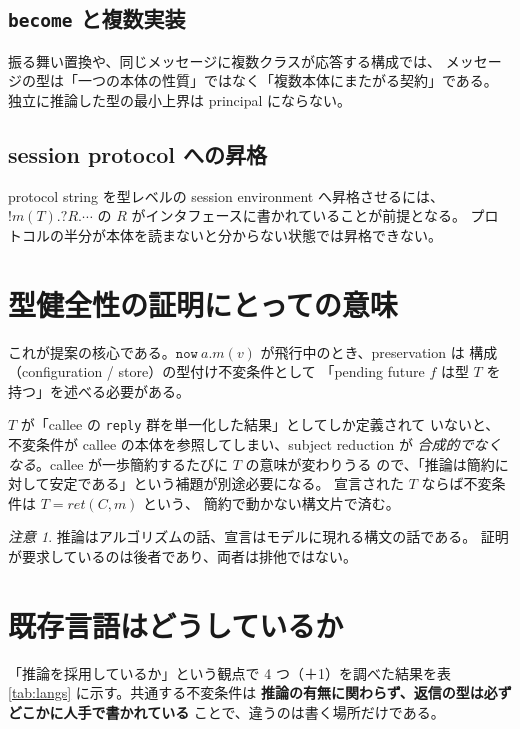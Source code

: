 \documentclass[11pt,a4paper]{ltjsarticle}
\theoremstyle{definition}
\theoremstyle{remark}
\newtheorem{remark}{注意}
\newcommand{\ty}[1]{\ensuremath{\mathtt{#1}}}
\begin{document}
\subsection{\texttt{become} と複数実装}

振る舞い置換や、同じメッセージに複数クラスが応答する構成では、
メッセージの型は「一つの本体の性質」ではなく「複数本体にまたがる契約」である。
独立に推論した型の最小上界は principal にならない。

\subsection{session protocol への昇格}

protocol string を型レベルの session environment へ昇格させるには、
$!m(T).?R.\cdots$ の $R$ がインタフェースに書かれていることが前提となる。
プロトコルの半分が本体を読まないと分からない状態では昇格できない。

\section{型健全性の証明にとっての意味}

これが提案の核心である。$\ty{now}\ a.m(v)$ が飛行中のとき、preservation は
構成（configuration / store）の型付け不変条件として
「pending future $f$ は型 $T$ を持つ」を述べる必要がある。

$T$ が「callee の \texttt{reply} 群を単一化した結果」としてしか定義されて
いないと、不変条件が callee の本体を参照してしまい、subject reduction が
\emph{合成的でなくなる}。callee が一歩簡約するたびに $T$ の意味が変わりうる
ので、「推論は簡約に対して安定である」という補題が別途必要になる。
宣言された $T$ ならば不変条件は $T = \mathit{ret}(C,m)$ という、
簡約で動かない構文片で済む。

\begin{remark}
推論はアルゴリズムの話、宣言はモデルに現れる構文の話である。
証明が要求しているのは後者であり、両者は排他ではない。
\end{remark}

\section{既存言語はどうしているか}

「推論を採用しているか」という観点で 4 つ（＋1）を調べた結果を表
\ref{tab:langs} に示す。共通する不変条件は
\textbf{推論の有無に関わらず、返信の型は必ずどこかに人手で書かれている}
ことで、違うのは書く場所だけである。
\end{document}
